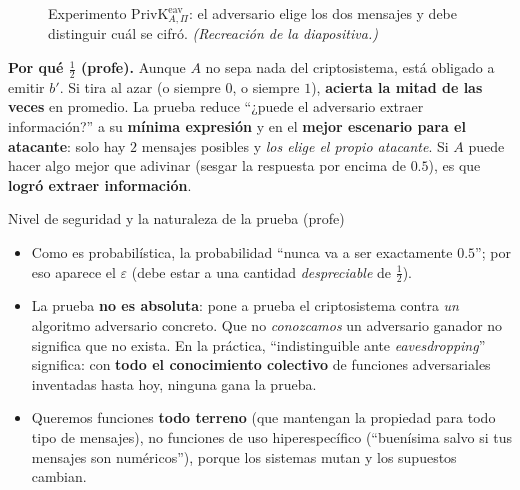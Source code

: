 \documentclass[11pt,a4paper]{article}
\newcommand{\Kset}{\mathcal{K}}
\DeclareMathOperator{\negl}{negl}
\newcommand{\E}{\mathsf{e}}
\newcommand{\bits}{\{0,1\}}
\begin{document}
\begin{figure}[h]
\centering
{}
\caption{Experimento $\mathrm{PrivK}^{\mathrm{eav}}_{A,\Pi}$: el adversario elige los dos
mensajes y debe distinguir cuál se cifró. \textit{(Recreación de la diapositiva.)}}
\end{figure}

\begin{slidebox}
\textbf{Por qué $\tfrac12$ (profe).} Aunque $A$ no sepa nada del criptosistema, está
obligado a emitir $b'$. Si tira al azar (o siempre $0$, o siempre $1$), \textbf{acierta
la mitad de las veces} en promedio. La prueba reduce ``¿puede el adversario extraer
información?'' a su \textbf{mínima expresión} y en el \textbf{mejor escenario para el
atacante}: solo hay $2$ mensajes posibles y \emph{los elige el propio atacante}. Si $A$
puede hacer algo mejor que adivinar (sesgar la respuesta por encima de $0.5$), es que
\textbf{logró extraer información}.
\end{slidebox}

\begin{practbox}{Nivel de seguridad y la naturaleza de la prueba (profe)}
\begin{itemize}[leftmargin=1.3em,itemsep=2pt]
  \item Como es probabilística, la probabilidad ``nunca va a ser exactamente $0.5$''; por
        eso aparece el $\varepsilon$ (debe estar a una cantidad \emph{despreciable} de
        $\tfrac12$).
  \item La prueba \textbf{no es absoluta}: pone a prueba el criptosistema contra
        \emph{un} algoritmo adversario concreto. Que no \emph{conozcamos} un adversario
        ganador no significa que no exista. En la práctica, ``indistinguible ante
        \emph{eavesdropping}'' significa: con \textbf{todo el conocimiento colectivo} de
        funciones adversariales inventadas hasta hoy, ninguna gana la prueba.
  \item Queremos funciones \textbf{todo terreno} (que mantengan la propiedad para todo
        tipo de mensajes), no funciones de uso hiperespecífico (``buenísima salvo si tus
        mensajes son numéricos''), porque los sistemas mutan y los supuestos cambian.
\end{itemize}
\end{practbox}
\end{document}
